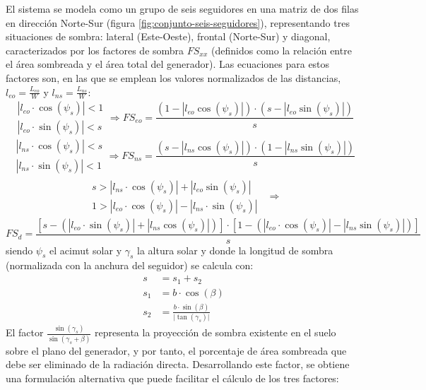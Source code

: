 El sistema se modela como un grupo de seis seguidores en una matriz de dos filas en dirección Norte-Sur (figura \ref{fig:conjunto-seis-seguidores}), representando tres situaciones de sombra: lateral (Este-Oeste), frontal (Norte-Sur) y diagonal, caracterizados por los factores de sombra \(FS_{xx}\) (definidos como la relación entre el área sombreada y el área total del generador). Las ecuaciones para estos factores son, en las que se emplean los valores normalizados de las distancias, \(l_{eo}=\frac{L_{eo}}{W}\) y \(l_{ns}=\frac{L_{ns}}{W}\):
\begin{equation}
\begin{array}{c}
|l_{eo}\cdot\cos(\psi_{s})|<1\\
|l_{eo}\cdot\sin(\psi_{s})|<s\end
{array}
\Rightarrow
FS_{eo}=\frac{(1-|l_{eo}\cos(\psi_{s})|)\cdot(s-|l_{eo}\sin(\psi_{s})|)}{s}
\end{equation}
\begin{equation}
\begin{array}{c}
|l_{ns}\cdot\cos(\psi_{s})|<s\\
|l_{ns}\cdot\sin(\psi_{s})|<1
\end{array}
\Rightarrow 
FS_{ns}=\frac{(s-|l_{ns}\cos(\psi_{s})|)\cdot(1-|l_{ns}\sin(\psi_{s})|)}{s}
\end{equation}
\begin{align*}
\begin{array}{c}
s>|l_{ns}\cdot\cos(\psi_{s})|+|l_{eo}\sin(\psi_{s})|\\
1>|l_{eo}\cdot\cos(\psi_{s})|-|l_{ns}\cdot\sin(\psi_{s})|
\end{array} 
& \Rightarrow
\end{align*}
\begin{equation}
FS_{d}=\frac{\left[s-\left(|l_{eo}\cdot\sin(\psi_{s})|+|l_{ns}\cos(\psi_{s})|\right)\right]\cdot\left[1-\left(|l_{eo}\cdot\cos(\psi_{s})|-|l_{ns}\sin(\psi_{s})|\right)\right]}{s}
\end{equation}
siendo \(\psi_{s}\) el acimut solar y \(\gamma_{s}\) la altura solar y donde la longitud de sombra (normalizada con la anchura del seguidor) se calcula con:
\begin{align}
s & =s_{1}+s_{2}\\
s_{1} & =b\cdot\cos(\beta)\\
s_{2} & =\frac{b\cdot\sin(\beta)}{\vert\tan(\gamma_{s})\vert}
\end{align}
El factor \(\frac{\sin(\gamma_{s})}{\sin(\gamma_{s}+\beta)}\) representa 
la proyección de sombra existente en el suelo sobre el plano del generador, y por tanto, el porcentaje de área sombreada que debe ser eliminado de la radiación directa. Desarrollando este factor, se obtiene una formulación alternativa que puede facilitar el cálculo de los tres factores:

